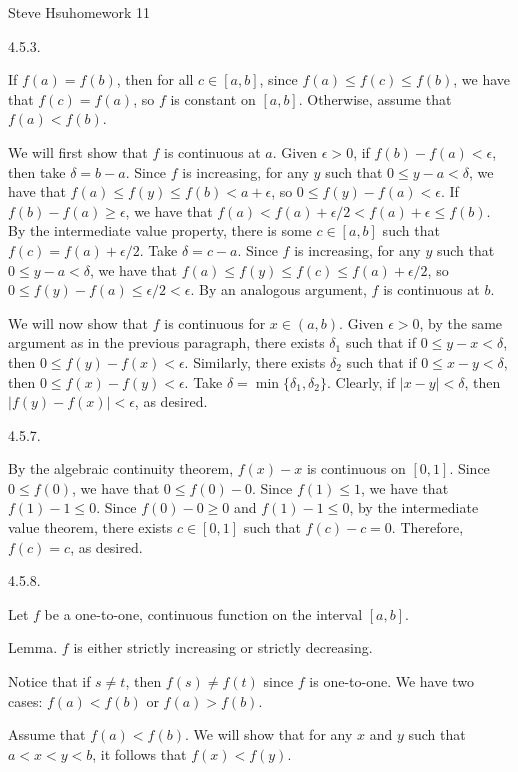 \def\abs#1{\vert#1\vert}
\centerline{Steve Hsu\hfill homework 11}
\item{4.5.3.}

If $f(a) = f(b)$, then for all $c \in [a,b]$,
since $f(a) \le f(c) \le f(b)$,
we have that $f(c) = f(a)$,
so $f$ is constant on $[a,b]$.
Otherwise, assume that $f(a) < f(b)$.

We will first show that $f$ is continuous at $a$.
Given $\epsilon > 0$, if $f(b) - f(a) < \epsilon$,
then take $\delta = b - a$.
Since $f$ is increasing, for any $y$ such that $0 \le y - a < \delta$,
we have that $f(a) \le f(y) \le f(b) < a + \epsilon$,
so $0 \le f(y) - f(a) < \epsilon$.
If $f(b) - f(a) \ge \epsilon$,
we have that $f(a) < f(a) + \epsilon/2 < f(a) + \epsilon \le f(b)$.
By the intermediate value property,
there is some $c \in [a,b]$ such that $f(c) = f(a) + \epsilon/2$.
Take $\delta = c - a$.
Since $f$ is increasing, for any $y$ such that $0 \le y - a < \delta$,
we have that $f(a) \le f(y) \le f(c) \le f(a) + \epsilon/2$,
so $0 \le f(y) - f(a) \le \epsilon/2 < \epsilon$.
By an analogous argument, $f$ is continuous at $b$.

We will now show that $f$ is continuous for $x \in (a,b)$.
Given $\epsilon > 0$,
by the same argument as in the previous paragraph,
there exists $\delta _1$ such that
if $0 \le y - x < \delta$, then $0 \le f(y) - f(x) < \epsilon$.
Similarly, there exists $\delta _2$ such that
if $0 \le x - y < \delta$, then $0 \le f(x) - f(y) < \epsilon$.
Take $\delta = \min\{\delta _1, \delta _2\}$.
Clearly, if $\abs{x - y} < \delta$,
then $\abs{f(y) - f(x)} < \epsilon$, as desired.
\bigskip
\item{4.5.7.}

By the algebraic continuity theorem, $f(x) - x$ is continuous on $[0,1]$.
Since $0 \le f(0)$, we have that $0 \le f(0) - 0$.
Since $f(1) \le 1$, we have that $f(1) - 1 \le 0$.
Since $f(0) - 0 \ge 0$ and $f(1) - 1 \le 0$,
by the intermediate value theorem,
there exists $c \in [0,1]$ such that $f(c) - c = 0$.
Therefore, $f(c) = c$, as desired.
\bigskip
\item{4.5.8.}

Let $f$ be a one-to-one, continuous function on the interval $[a,b]$.

\proclaim Lemma. $f$ is either strictly increasing or strictly decreasing.

Notice that if $s \ne t$, then $f(s) \ne f(t)$ since $f$ is one-to-one.
We have two cases: $f(a) < f(b)$ or $f(a) > f(b)$.

Assume that $f(a) < f(b)$.
We will show that for any $x$ and $y$ such that $a < x < y < b$,
it follows that $f(x) < f(y)$.

